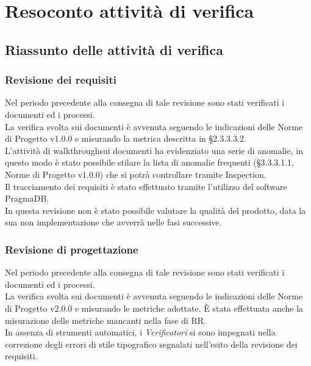 \section{Resoconto attività di verifica}

\subsection{Riassunto delle attività di verifica}

	\subsubsection{Revisione dei requisiti}
	
	Nel periodo precedente alla consegna di tale revisione sono stati verificati i documenti ed i processi. \\
	La verifica svolta sui documenti è avvenuta seguendo le indicazioni delle Norme di Progetto v1.0.0 e misurando la metrica descritta in §2.3.3.3.2. \\
	L'attività di walkthrough\glosp sui documenti ha evidenziato una serie di anomalie, in questo modo è stato possibile stilare la lista di anomalie frequenti (§3.3.3.1.1, Norme di Progetto v1.0.0) che si potrà controllare tramite Inspection\glosp. \\
	Il tracciamento dei requisiti è stato effettuato tramite l'utilizzo del software PragmaDB. \\
	In questa revisione non è stato possibile valutare la qualità del prodotto, data la sua non implementazione che avverrà nelle fasi successive.
	
	\subsubsection{Revisione di progettazione}
	
	Nel periodo precedente alla consegna di tale revisione sono stati verificati i documenti ed i processi. \\
	La verifica svolta sui documenti è avvenuta seguendo le indicazioni delle Norme di Progetto v2.0.0 e misurando le metriche adottate. È stata effettuata anche la misurazione delle metriche mancanti nella fase di RR. \\
	In assenza di strumenti automatici, i \textit{Verificatori} si sono impegnati nella correzione degli errori di stile tipografico segnalati nell'esito della revisione dei requisiti.
	
